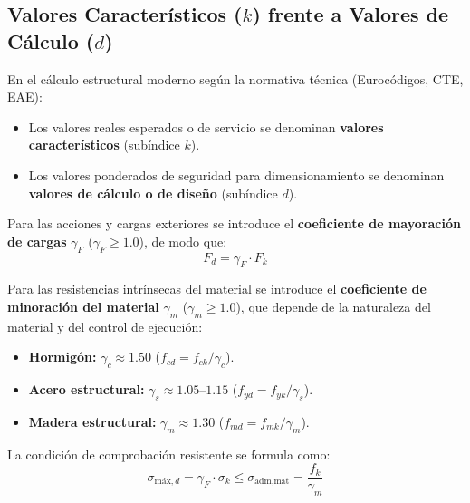 \subsection{Valores Característicos ($k$) frente a Valores de Cálculo ($d$)}

En el cálculo estructural moderno según la normativa técnica (Eurocódigos, CTE, EAE):
\begin{itemize}
    \item Los valores reales esperados o de servicio se denominan \textbf{valores característicos} (subíndice $k$).
    \item Los valores ponderados de seguridad para dimensionamiento se denominan \textbf{valores de cálculo o de diseño} (subíndice $d$).
\end{itemize}

Para las acciones y cargas exteriores se introduce el \textbf{coeficiente de mayoración de cargas} $\gamma_F$ ($\gamma_F \ge 1.0$), de modo que:
\begin{equation}
    F_d = \gamma_F \cdot F_k
\end{equation}

Para las resistencias intrínsecas del material se introduce el \textbf{coeficiente de minoración del material} $\gamma_m$ ($\gamma_m \ge 1.0$), que depende de la naturaleza del material y del control de ejecución:
\begin{itemize}
    \item \textbf{Hormigón:} $\gamma_c \approx 1.50$ ($f_{cd} = f_{ck} / \gamma_c$).
    \item \textbf{Acero estructural:} $\gamma_s \approx 1.05\text{--}1.15$ ($f_{yd} = f_{yk} / \gamma_s$).
    \item \textbf{Madera estructural:} $\gamma_m \approx 1.30$ ($f_{md} = f_{mk} / \gamma_m$).
\end{itemize}

La condición de comprobación resistente se formula como:
\begin{equation}
    \sigma_{\text{máx},d} = \gamma_F \cdot \sigma_k \le \sigma_{\text{adm,mat}} = \frac{f_k}{\gamma_m}
\end{equation}

